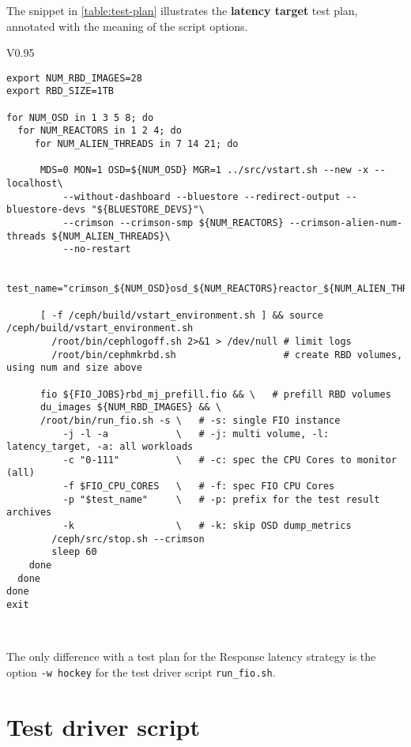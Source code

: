The snippet in \ref{table:test-plan} illustrates the {\bf latency target} test plan, annotated with the meaning of
the script options.

\begin{table}[h!]
\centering
  \begin{tabular}{V{0.95\textwidth}}
\toprule
    \begin{small}
\begin{verbatim}
export NUM_RBD_IMAGES=28
export RBD_SIZE=1TB

for NUM_OSD in 1 3 5 8; do
  for NUM_REACTORS in 1 2 4; do
     for NUM_ALIEN_THREADS in 7 14 21; do 

      MDS=0 MON=1 OSD=${NUM_OSD} MGR=1 ../src/vstart.sh --new -x --localhost\
          --without-dashboard --bluestore --redirect-output --bluestore-devs "${BLUESTORE_DEVS}"\
          --crimson --crimson-smp ${NUM_REACTORS} --crimson-alien-num-threads ${NUM_ALIEN_THREADS}\
          --no-restart

      test_name="crimson_${NUM_OSD}osd_${NUM_REACTORS}reactor_${NUM_ALIEN_THREADS}at_8fio_1tb_lt"
	
      [ -f /ceph/build/vstart_environment.sh ] && source /ceph/build/vstart_environment.sh
	    /root/bin/cephlogoff.sh 2>&1 > /dev/null # limit logs
	    /root/bin/cephmkrbd.sh                   # create RBD volumes, using num and size above

      fio ${FIO_JOBS}rbd_mj_prefill.fio && \   # prefill RBD volumes
      du_images ${NUM_RBD_IMAGES} && \
      /root/bin/run_fio.sh -s \   # -s: single FIO instance
          -j -l -a            \   # -j: multi volume, -l: latency_target, -a: all workloads
          -c "0-111"          \   # -c: spec the CPU Cores to monitor (all)
          -f $FIO_CPU_CORES   \   # -f: spec FIO CPU Cores
          -p "$test_name"     \   # -p: prefix for the test result archives
          -k                  \   # -k: skip OSD dump_metrics
	    /ceph/src/stop.sh --crimson
	    sleep 60
    done
  done
done
exit
\end{verbatim}
    \end{small}
\\
\end{tabular}
\caption{Organisation of the test plan.}
\label{table:test-plan}
\end{table}

The only difference with a test plan for the Response latency strategy is the option {\tt -w hockey}
for the test driver script {\tt run\_fio.sh}.

\section{Test driver script}

